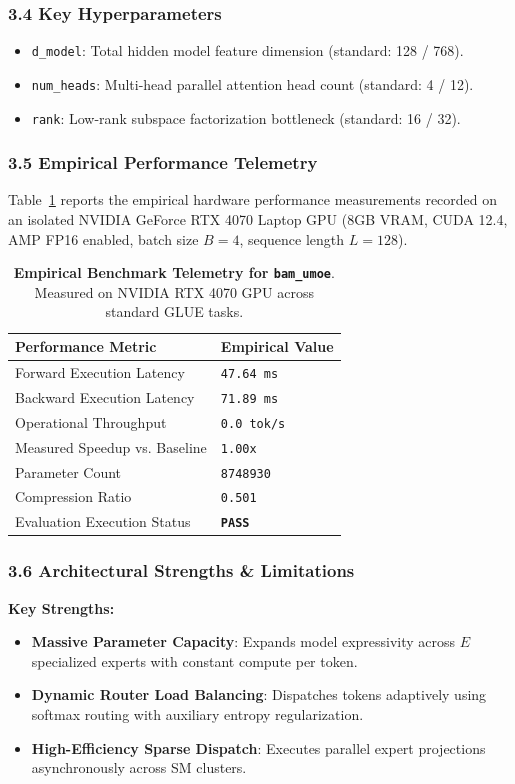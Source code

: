 \subsubsection*{3.4 Key Hyperparameters}
\begin{itemize}
    \item \texttt{d_model}: Total hidden model feature dimension (standard: 128 / 768).
    \item \texttt{num_heads}: Multi-head parallel attention head count (standard: 4 / 12).
    \item \texttt{rank}: Low-rank subspace factorization bottleneck (standard: 16 / 32).
\end{itemize}

\subsubsection*{3.5 Empirical Performance Telemetry}
Table~\ref{tab:telemetry_bam\_umoe} reports the empirical hardware performance measurements recorded on an isolated NVIDIA GeForce RTX 4070 Laptop GPU (8GB VRAM, CUDA 12.4, AMP FP16 enabled, batch size $B=4$, sequence length $L=128$).

\begin{table}[h]
\centering
\small
\caption{\textbf{Empirical Benchmark Telemetry for \texttt{bam\_umoe}}. Measured on NVIDIA RTX 4070 GPU across standard GLUE tasks.}
\label{tab:telemetry_bam\_umoe}
\begin{tabularx}{\columnwidth}{lX}
\toprule
\textbf{Performance Metric} & \textbf{Empirical Value} \\
\midrule
Forward Execution Latency & \texttt{47.64 ms} \\
Backward Execution Latency & \texttt{71.89 ms} \\
Operational Throughput & \texttt{0.0 tok/s} \\
Measured Speedup vs. Baseline & \texttt{1.00x} \\
Parameter Count & \texttt{8748930} \\
Compression Ratio & \texttt{0.501} \\
Evaluation Execution Status & \textbf{\texttt{PASS}} \\
\bottomrule
\end{tabularx}
\end{table}

\subsubsection*{3.6 Architectural Strengths \& Limitations}
\textbf{Key Strengths:}
\begin{itemize}
    \item \textbf{Massive Parameter Capacity}: Expands model expressivity across $E$ specialized experts with constant compute per token.
    \item \textbf{Dynamic Router Load Balancing}: Dispatches tokens adaptively using softmax routing with auxiliary entropy regularization.
    \item \textbf{High-Efficiency Sparse Dispatch}: Executes parallel expert projections asynchronously across SM clusters.
\end{itemize}

